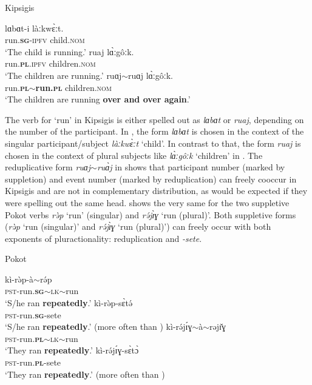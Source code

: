 \documentclass[output=paper,colorlinks,citecolor=brown
]{langscibook}
\begin{document}
\ea \label{ex:fiebig:suppl} Kipsigis \cite[7]{KouneliProp}
\begin{xlist}
\ex \label{ex:fiebig:suppl-sg}
\gll lɑbɑt-i làːkwɛ̀ːt. \\
run.\textsc{\textbf{sg}-ipfv} child.\textsc{nom} \\
\glt `The child is running.' 
\ex \label{ex:fiebig:suppl-pl}
\gll ruaj lɑ̀ːgôːk. \\
run.\textsc{\textbf{pl}.ipfv} children.\textsc{nom} \\
\glt `The children are running.' 
\ex \label{ex:fiebig:suppl-red}
\gll ruɑj$\sim$ruɑj lɑ̀ːgôːk.\\
run.\textbf{\textsc{pl}$\sim$run.\textsc{pl}} children.\textsc{nom}\\ 
\glt `The children are running \textbf{over and over again}.'
\end{xlist}
\z

\noindent The verb for `run' in Kipsigis is either spelled out as \textit{lɑbɑt} or \textit{ruaj}, depending on the number of the participant. In , the form \textit{lɑbɑt} is chosen in the context of the singular participant/subject \textit{làːkwɛ̀ːt} `child'. In contrast to that, the form \textit{ruaj} is chosen in the context of plural subjects like \textit{lɑ̀ːgôːk} `children' in . The reduplicative form \textit{ruɑj$\sim$ruɑ̀j} in  shows that participant number (marked by suppletion) and event number (marked by reduplication) can freely cooccur in Kipsigis and are not in complementary distribution, as would be expected if they were spelling out the same head. 
 shows the very same for the two suppletive Pokot verbs \textit{rə̀p} `run' (singular) and \textit{rə́jɪ̀ɣ} `run (plural)'. Both suppletive forms (\textit{rə̀p} `run (singular)' and \textit{rə́jɪ̀ɣ} `run (plural)') can freely occur with both exponents of pluractionality: reduplication and \textit{-sete}.


\ea Pokot \label{ex:fiebig:supplPok}
\begin{xlist}
\ex \label{ex:fiebig:run-red}
\gll kì-rə̀p-à$\sim$rə́p\\
\textsc{pst}-run.\textsc{\textbf{sg}$\sim$lk}$\sim$run\\
\glt `S/he ran \textbf{repeatedly}.' 
\ex 
\gll kì-rə̀p-sɛ̀tə́\\
\textsc{pst}-run.\textsc{\textbf{sg}}-sete\\
\glt `S/he ran \textbf{repeatedly}.' (more often than )
\ex \label{ex:fiebig:run.pl-red}
\gll kì-rə́jɪ́ɣ$\sim$à$\sim$rəjɪ̌ɣ\\
\textsc{pst}-run.\textsc{\textbf{pl}$\sim$lk}$\sim$run\\
\glt `They ran \textbf{repeatedly}.' 
\ex 
\gll kì-rə́jɪ́ɣ-sɛ̀tɔ̀\\
\textsc{pst}-run.\textsc{\textbf{pl}}-sete\\
\glt `They ran \textbf{repeatedly}.' (more often than )
\end{xlist}
\z
\end{document}
